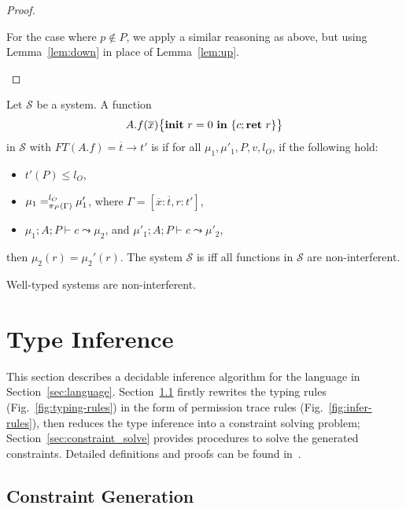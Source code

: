 {{{\begin{proof}
\begin{ProofEnumDesc}
For the case where $p \not \in P$, we apply a similar reasoning as above,
but using Lemma~\ref{lem:down} in place of Lemma~\ref{lem:up}.
\end{ProofEnumDesc}
\end{proof}


\begin{definition}\label{def:sys-ni}
Let $\mathcal{S}$ be a system.
A function
$${A.f}(\overline{x})\big\{{{\textbf{init}~ {r}=0 ~\textbf{in}~\{{c};\textbf{ret}~{r}\}}}\big\}$$
in $\mathcal{S}$
with $FT(A.f) = \overline{t} \rightarrow t'$
is {}
if for all $\mu_1, \mu'_1, P, v, l_{O}$,
if the following hold:
\begin{itemize}
\item $t'(P) \leq l_{O}$,
\item $\mu_1 =_{\pi_{{P}}({\Gamma})}^{l_{O}} \mu'_1$, where
$\Gamma = [\overline{x} : \overline{t}, r : t']$,
\item $\mu_1;A ; P\vdash c \leadsto \mu_2 $, and $\mu'_1; A; P\vdash c\leadsto \mu'_2 $,
\end{itemize}
then $\mu_2(r) = \mu_2'(r).$
The system $\mathcal{S}$ is  iff all functions
in $\mathcal{S}$ are non-interferent.
\end{definition}

\begin{theorem}\label{thm:ni}
Well-typed systems are non-interferent.
\end{theorem}



 \section{Type Inference}\label{sec:constraint_gen}
This section describes a decidable inference algorithm for the language  in Section~\ref{sec:language}.
Section~\ref{sec:constraint-gen-rules} firstly rewrites the typing
rules (Fig.~\ref{fig:typing-rules}) in the form of permission trace
rules (Fig.~\ref{fig:infer-rules}), then reduces the type inference
into a constraint solving problem; Section~\ref{sec:constraint_solve}
provides procedures to solve the generated constraints. Detailed
definitions and proofs can be found in~\cite{Chen17arxiv}.


\subsection{Constraint Generation}\label{sec:constraint-gen-rules}
}}}
